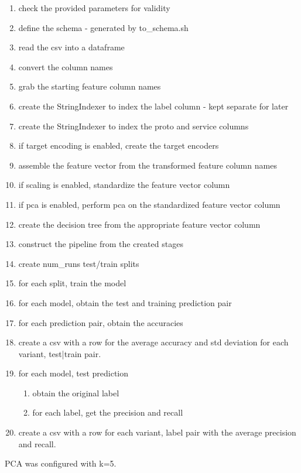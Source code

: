 \documentclass[11pt]{article}
\begin{document}
\begin{enumerate}[nosep]
    \item check the provided parameters for validity
    \item define the schema - generated by to\_schema.sh
    \item read the csv into a dataframe
    \item convert the column names
    \item grab the starting feature column names
    \item create the StringIndexer to index the label column - kept separate for later
    \item create the StringIndexer to index the proto and service columns
    \item if target encoding is enabled, create the target encoders
    \item assemble the feature vector from the transformed feature column names
    \item if scaling is enabled, standardize the feature vector column
    \item if pca is enabled, perform pca on the standardized feature vector column
	\item create the decision tree from the appropriate feature vector column
	\item construct the pipeline from the created stages
	\item create num\_runs test/train splits
	\item for each split, train the model
	\item for each model, obtain the test and training prediction pair
	\item for each prediction pair, obtain the accuracies
	\item create a csv with a row for the average accuracy and std deviation for each {variant, test|train} pair.
	\item for each {model, test prediction}
	\begin{enumerate}[nosep]
		\item obtain the original label
		\item for each label, get the precision and recall
	\end{enumerate}
	\item create a csv with a row for each {variant, label} pair with the average precision and recall.
\end{enumerate}

PCA was configured with k=5.
\end{document}
